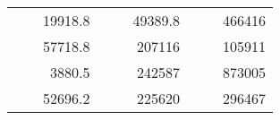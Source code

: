 \begin{table}[H]
\begin{tabular}{|ccrccrccc}
\rowcolor[HTML]{DDFDFF} 
\multicolumn{1}{|c|}{\cellcolor[HTML]{FFFFC7}}                                & \multicolumn{1}{c|}{\cellcolor[HTML]{DDFDFF}}                      & \multicolumn{1}{r|}{\cellcolor[HTML]{DAE8FC}19918.8}   & \multicolumn{1}{c|}{\cellcolor[HTML]{FFFFC7}}                                & \multicolumn{1}{c|}{\cellcolor[HTML]{DDFDFF}}                       & \multicolumn{1}{r|}{\cellcolor[HTML]{DDFDFF}49389.8}   & \multicolumn{1}{c|}{\cellcolor[HTML]{FFFFC7}}                                & \multicolumn{1}{c|}{\cellcolor[HTML]{DDFDFF}}                      & \multicolumn{1}{r|}{\cellcolor[HTML]{DDFDFF}466416}    \\ \cline{3-3} \cline{6-6} \cline{9-9} 
\multicolumn{1}{|c|}{\cellcolor[HTML]{FFFFC7}}                                & \multicolumn{1}{c|}{\cellcolor[HTML]{DDFDFF}}                      & \multicolumn{1}{r|}{\cellcolor[HTML]{DDFDFF}57718.8}   & \multicolumn{1}{c|}{\cellcolor[HTML]{FFFFC7}}                                & \multicolumn{1}{c|}{\cellcolor[HTML]{DDFDFF}}                       & \multicolumn{1}{r|}{\cellcolor[HTML]{DAE8FC}207116}    & \multicolumn{1}{c|}{\cellcolor[HTML]{FFFFC7}}                                & \multicolumn{1}{c|}{\cellcolor[HTML]{DDFDFF}}                      & \multicolumn{1}{r|}{\cellcolor[HTML]{DAE8FC}105911}    \\ \cline{3-3} \cline{6-6} \cline{9-9} 
\rowcolor[HTML]{DDFDFF} 
\multicolumn{1}{|c|}{\cellcolor[HTML]{FFFFC7}}                                & \multicolumn{1}{c|}{\cellcolor[HTML]{DDFDFF}}                      & \multicolumn{1}{r|}{\cellcolor[HTML]{DAE8FC}3880.5}    & \multicolumn{1}{c|}{\cellcolor[HTML]{FFFFC7}}                                & \multicolumn{1}{c|}{\cellcolor[HTML]{DDFDFF}}                       & \multicolumn{1}{r|}{\cellcolor[HTML]{DDFDFF}242587}    & \multicolumn{1}{c|}{\cellcolor[HTML]{FFFFC7}}                                & \multicolumn{1}{c|}{\cellcolor[HTML]{DDFDFF}}                      & \multicolumn{1}{r|}{\cellcolor[HTML]{DDFDFF}873005}    \\ \cline{3-3} \cline{6-6} \cline{9-9} 
\multicolumn{1}{|c|}{\cellcolor[HTML]{FFFFC7}}                                & \multicolumn{1}{c|}{\cellcolor[HTML]{DDFDFF}}                      & \multicolumn{1}{r|}{\cellcolor[HTML]{DDFDFF}52696.2}   & \multicolumn{1}{c|}{\cellcolor[HTML]{FFFFC7}}                                & \multicolumn{1}{c|}{\cellcolor[HTML]{DDFDFF}}                       & \multicolumn{1}{r|}{\cellcolor[HTML]{DAE8FC}225620}    & \multicolumn{1}{c|}{\cellcolor[HTML]{FFFFC7}}                                & \multicolumn{1}{c|}{\cellcolor[HTML]{DDFDFF}}                      & \multicolumn{1}{r|}{\cellcolor[HTML]{DAE8FC}296467}    \\ \cline{3-3} \cline{6-6} \cline{9-9} 

\end{tabular}
\end{table}
